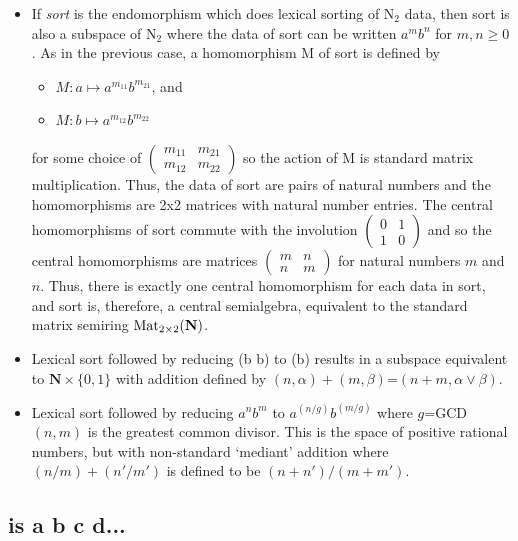 \documentclass[11pt]{article}
\begin{document}
\begin{itemize}
\item{If {\it sort} is the endomorphism which does lexical sorting of N$_2$ data, then sort is also a subspace of N$_2$ where the 
data of sort can be written $a^m b^n$ for $m,n\ge 0$.  As in the previous case, a homomorphism M of sort is defined by  
\begin{itemize}
\item [] $M: a\mapsto a^{m_{11}} b^{m_{21}}$, and 
\item [] $M: b\mapsto a^{m_{12}} b^{m_{22}}$ 
\end{itemize}
for some choice of 
$
\left (
\begin{array}{cc} 
m_{11} & m_{21} \\ m_{12} & m_{22}  
\end{array}
\right ) 
$
so the action of M is standard matrix multiplication.  Thus, the data of sort are pairs of natural numbers and the 
homomorphisms are 2x2 matrices with natural number entries.  The central homomorphisms of sort 
commute with the involution 
$
\left (
\begin{array}{cc} 
0 & 1 \\ 1 & 0 
\end{array}
\right ) 
$
and so the central homomorphisms are matrices 
$
\left (
\begin{array}{cc} 
m & n \\ n & m 
\end{array}
\right ) 
$
for natural numbers $m$ and $n$.  Thus, there is exactly one central homomorphism for each data in sort, 
and sort is, therefore, a central semialgebra, equivalent to the standard matrix semiring ${\rm Mat}_{2\times2}(\mathbf N)$.
}

\item{Lexical sort followed by reducing (b b) to (b) results in a subspace equivalent to $\mathbf N\times\{0,1\}$ with addition
defined by $(n,\alpha)+(m,\beta)$=$(n+m,\alpha\vee\beta)$.}

\item{Lexical sort followed by reducing $a^n b^m$ to $a^{(n/g)} b^{(m/g)}$ where $g$=GCD$(n,m)$ is the greatest common divisor.  
This is the space of positive rational numbers, but with non-standard `mediant' addition where $(n/m)+(n'/m')$ is defined to be 
$(n+n')/(m+m')$\cite{mediant}.}

\end{itemize}

\subsection{is a b c d...} 
\end{document}
